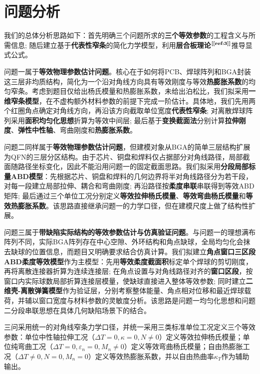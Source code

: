 \documentclass[draft,12pt,a4paper]{ctexart}
\theoremstyle{definition}
\begin{document}

\section{问题分析}

我们的总体分析思路如下：首先明确三个问题所求的\textbf{三个等效参数}的工程含义与所需信息; 随后建立基于\textbf{代表性窄条}的简化力学模型，利用\textbf{层合板理论}$^{\textbf{[\ref{ref:3}]}}$推导显式公式。

问题一属于\textbf{等效物理参数估计问题}。核心在于如何将PCB、焊球阵列和BGA封装这三层非均质结构，简化为一个沿对角线方向具有等效刚度与等效\textbf{热膨胀系数}的均匀窄条。考虑到题目仅给出杨氏模量和热膨胀系数，未给出泊松比，我们拟采用\textbf{一维窄条模型}，在不虚构额外材料参数的前提下完成一阶估计。具体地，我们先用两个红圈角点确定对角线方向，再沿该方向截取单位宽度\textbf{代表性窄条}; 对离散焊球阵列采用\textbf{面积均匀化思想}折算为等效中间层; 最后基于\textbf{变换截面法}分别计算\textbf{拉伸刚度}、\textbf{弹性中性轴}、弯曲刚度和\textbf{热膨胀系数}。

问题二同样属于\textbf{等效物理参数估计问题}，但建模对象从BGA的简单三层结构扩展为QFN的三层分区结构。由于芯片、铜盘和焊料仅占据部分对角线路径，局部截面随路径坐标变化，因此不能沿用问题一的固定截面思路。我们拟采用\textbf{分段局部标量ABD模型}：先根据芯片、铜盘和焊料的几何边界将半对角线路径分为若干段，对每一段建立局部拉伸、耦合和弯曲刚度; 再沿路径按\textbf{柔度串联}串联得到等效ABD矩阵; 最后通过三个单位工况分别定义\textbf{等效拉伸杨氏模量}、\textbf{等效弯曲杨氏模量}和\textbf{等效热膨胀系数}。该思路直接继承问题一的力学口径，但在建模尺度上做了结构性扩展。

问题三属于\textbf{带缺陷实际结构的等效参数估计与仿真验证问题}。与问题一的理想满布阵列不同，实际BGA阵列存在中心空隙、外环结构和角点缺球，全局均匀化会抹去缺球的位置信息，而题目又明确要求结合仿真计算。我们拟建立\textbf{角点窗口三区段ABD柔度等效模型}作为主模型：先用\textbf{等效柔度截面积}标定单个焊球的剪切刚度，再将离散连接器折算为连续连接层; 在角点设置与对角线路径对齐的\textbf{窗口区段}，按窗口内实际球数局部折算连接层模量，使缺球直接进入整体等效参数; 同时建立\textbf{二维壳-离散弹簧模型}作为验证层，分别考察整体能量、角点相对位移和最近焊球载荷，并辅以窗口宽度与材料参数的灵敏度分析。该思路是问题一均匀化思想和问题二分段串联思想在具体几何缺陷场景下的结合。

三问采用统一的对角线窄条力学口径，并统一采用三类标准单位工况定义三个等效参数：单位中性轴拉伸工况（$\Delta T=0,\kappa=0,N\neq0$）定义等效拉伸杨氏模量；单位纯弯曲工况（$\Delta T=0,\varepsilon_n=0,M_n\neq0$）定义等效弯曲杨氏模量；自由热膨胀工况（$\Delta T\neq0,N=0,M_n=0$）定义等效热膨胀系数，并以自由热曲率$\kappa_T$作为辅助输出。
\end{document}
